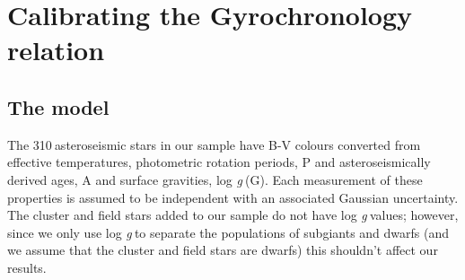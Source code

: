 \documentclass[10pt,preprint]{aastex}
\newcommand{\logg}{log \emph{g}}
\newcommand{\nastero}{310}
\newcommand{\ntotal}{521~}
\begin{document}


\section{Calibrating the Gyrochronology relation}
\label{sec:gyro_cal}

\subsection{The model}

The \nastero$~$asteroseismic stars in our sample have B-V colours converted from effective temperatures, photometric rotation periods, P and asteroseismically derived ages, A and surface gravities, \logg$~$(G).
 Each measurement of these properties is assumed to be independent with an associated Gaussian uncertainty.
The cluster and field stars added to our sample do not have \logg$~$values; however, since we only use \logg$~$to separate the populations of subgiants and dwarfs (and we assume that the cluster and field stars are dwarfs) this shouldn't affect our results.
\end{document}
